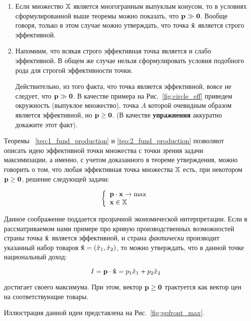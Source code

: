 \begin{note}
\begin{enumerate}
  \item Если множество $\mathbb{X}$ является многогранным выпуклым конусом, то в
условиях сформулированной выше теоремы можно показать, что $\mathbf{p}
\gg \mathbf{0}$. Вообще говоря, только в этом случае можно утверждать,
что точка $\mathbf{\hat x}$ является строго эффективной.

  \item Напомним, что всякая строго эффективная точка
  является и слабо эффективной. В общем же случае нельзя сформулировать
  условия подобного рода для строгой эффективности точки.

  Действительно, из того факта, что точка
  является эффективной, вовсе не следует, что $\mathbf{p} \gg \mathbf{0}$. В
  качестве примера на Рис.~\ref{fig:circle_eff} приведем окружность (выпуклое
  множество), точка $A$ которой очевидным образом является
  эффективной, но $\mathbf{p} \geq \mathbf{0}$. (В качестве \textbf{упражнения}
  аккуратно докажите этот факт).



\end{enumerate}


\end{note}


\begin{comm}

Теоремы ~\ref{teo:1_fund_production} и \ref{teo:2_fund_production}
позволяют описать идею эффективной точки множества с точки зрения
задачи максимизации, а именно, с учетом доказанного в теореме
утверждения, можно говорить о том, что любая эффективная точка
множества $\mathbb{X}$ есть, при некотором $\mathbf{p} \geq \mathbf{0}$, решение
следующей задачи:

\[
\left\{ \begin{array}{l}
 \mathbf{p} \cdot \mathbf{x} \to \max  \\
 \mathbf{x} \in \mathbb{X} \\
 \end{array} \right.
\]

Данное соображение поддается прозрачной экономической интерпретации.
Если в рассматриваемом нами примере про кривую производственных
возможностей страны точка $\mathbf{\hat x}$ является эффективной, и
страна \emph{фактически} производит указанный набор товаров
$\mathbf{\hat x}=(\hat x_1, \hat x_2)$, то можно утверждать, что в
данной точке национальный доход:

\[
I = \mathbf{p} \cdot \mathbf{\hat x}= p_1\hat x_1 + p_2 \hat x_2
\]

\noindent достигает своего максимума. При этом, вектор $\mathbf{p} \geq
\mathbf{0}$ трактуется как вектор цен на соответствующие товары.

Иллюстрация данной идеи представлена на Рис.~\ref{fig:ppfront_max}.



\end{comm}


